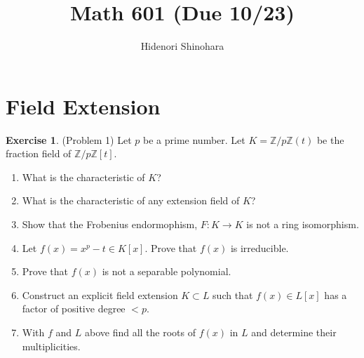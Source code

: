 \documentclass[12pt, psamsfonts]{amsart}
\theoremstyle{definition}
\newtheorem*{exer}{Exercise}
\theoremstyle{remark}
\numberwithin{equation}{section}
\begin{document}
\title{Math 601 (Due 10/23)}
\author{Hidenori Shinohara}
\maketitle

\tableofcontents

\section{Field Extension}

\begin{exer}{(Problem 1)}
  Let $p$ be a prime number.
  Let $K = \mathbb{Z} / p\mathbb{Z}(t)$ be the fraction field of $\mathbb{Z} / p\mathbb{Z}[t]$.
  \begin{enumerate}[label=(\roman*)]
    \item
      What is the characteristic of $K$?
    \item
      What is the characteristic of any extension field of $K$?
    \item
      Show that the Frobenius endormophism, $F: K \rightarrow K$ is not a ring isomorphism.
    \item
      Let $f(x) = x^p - t \in K[x]$.
      Prove that $f(x)$ is irreducible.
    \item
      Prove that $f(x)$ is not a separable polynomial.
    \item
      Construct an explicit field extension $K \subset L$ such that $f(x) \in L[x]$ has a factor of positive degree $< p$.
    \item
      With $f$ and $L$ above find all the roots of $f(x)$ in $L$ and determine their multiplicities.
  \end{enumerate}
\end{exer}
\end{document}
